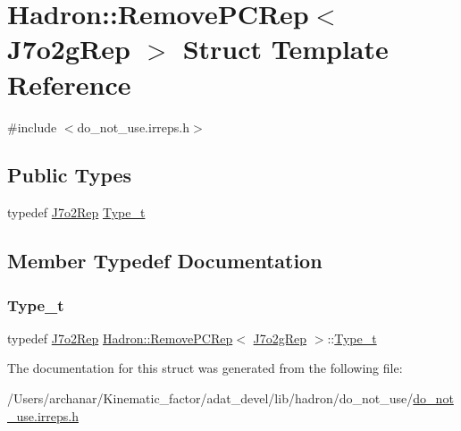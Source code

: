 \hypertarget{structHadron_1_1RemovePCRep_3_01J7o2gRep_01_4}{}\section{Hadron\+:\+:Remove\+P\+C\+Rep$<$ J7o2g\+Rep $>$ Struct Template Reference}
\label{structHadron_1_1RemovePCRep_3_01J7o2gRep_01_4}


{\ttfamily \#include $<$do\+\_\+not\+\_\+use.\+irreps.\+h$>$}

\subsection*{Public Types}
\begin{DoxyCompactItemize}
\item 
typedef \mbox{\hyperlink{structHadron_1_1J7o2Rep}{J7o2\+Rep}} \mbox{\hyperlink{structHadron_1_1RemovePCRep_3_01J7o2gRep_01_4_a588ca5a96069442fc4282729bdc40e7f}{Type\+\_\+t}}
\end{DoxyCompactItemize}


\subsection{Member Typedef Documentation}
\mbox{\label{structHadron_1_1RemovePCRep_3_01J7o2gRep_01_4_a588ca5a96069442fc4282729bdc40e7f}} 
\subsubsection{\texorpdfstring{Type\_t}{Type\_t}}
{\footnotesize\ttfamily typedef \mbox{\hyperlink{structHadron_1_1J7o2Rep}{J7o2\+Rep}} \mbox{\hyperlink{structHadron_1_1RemovePCRep}{Hadron\+::\+Remove\+P\+C\+Rep}}$<$ \mbox{\hyperlink{structHadron_1_1J7o2gRep}{J7o2g\+Rep}} $>$\+::\mbox{\hyperlink{structHadron_1_1RemovePCRep_3_01J7o2gRep_01_4_a588ca5a96069442fc4282729bdc40e7f}{Type\+\_\+t}}}



The documentation for this struct was generated from the following file\+:\begin{DoxyCompactItemize}
\item 
/\+Users/archanar/\+Kinematic\+\_\+factor/adat\+\_\+devel/lib/hadron/do\+\_\+not\+\_\+use/\mbox{\hyperlink{do__not__use_8irreps_8h}{do\+\_\+not\+\_\+use.\+irreps.\+h}}\end{DoxyCompactItemize}
